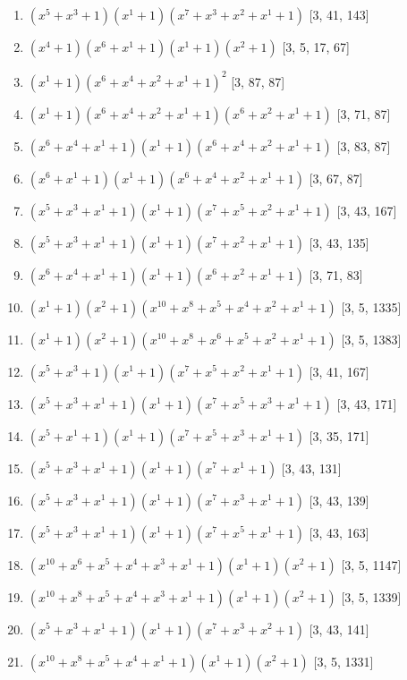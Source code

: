 \documentclass[10pt,twocolumn]{article}
\begin{document}
\begin{enumerate}
\item $(x^{5} + x^{3} + 1)(x^{1} + 1)(x^{7} + x^{3} + x^{2} + x^{1} + 1)$  [3, 41, 143]
\item $(x^{4} + 1)(x^{6} + x^{1} + 1)(x^{1} + 1)(x^{2} + 1)$  [3, 5, 17, 67]
\item $(x^{1} + 1)(x^{6} + x^{4} + x^{2} + x^{1} + 1)^{2}$  [3, 87, 87]
\item $(x^{1} + 1)(x^{6} + x^{4} + x^{2} + x^{1} + 1)(x^{6} + x^{2} + x^{1} + 1)$  [3, 71, 87]
\item $(x^{6} + x^{4} + x^{1} + 1)(x^{1} + 1)(x^{6} + x^{4} + x^{2} + x^{1} + 1)$  [3, 83, 87]
\item $(x^{6} + x^{1} + 1)(x^{1} + 1)(x^{6} + x^{4} + x^{2} + x^{1} + 1)$  [3, 67, 87]
\item $(x^{5} + x^{3} + x^{1} + 1)(x^{1} + 1)(x^{7} + x^{5} + x^{2} + x^{1} + 1)$  [3, 43, 167]
\item $(x^{5} + x^{3} + x^{1} + 1)(x^{1} + 1)(x^{7} + x^{2} + x^{1} + 1)$  [3, 43, 135]
\item $(x^{6} + x^{4} + x^{1} + 1)(x^{1} + 1)(x^{6} + x^{2} + x^{1} + 1)$  [3, 71, 83]
\item $(x^{1} + 1)(x^{2} + 1)(x^{10} + x^{8} + x^{5} + x^{4} + x^{2} + x^{1} + 1)$  [3, 5, 1335]
\item $(x^{1} + 1)(x^{2} + 1)(x^{10} + x^{8} + x^{6} + x^{5} + x^{2} + x^{1} + 1)$  [3, 5, 1383]
\item $(x^{5} + x^{3} + 1)(x^{1} + 1)(x^{7} + x^{5} + x^{2} + x^{1} + 1)$  [3, 41, 167]
\item $(x^{5} + x^{3} + x^{1} + 1)(x^{1} + 1)(x^{7} + x^{5} + x^{3} + x^{1} + 1)$  [3, 43, 171]
\item $(x^{5} + x^{1} + 1)(x^{1} + 1)(x^{7} + x^{5} + x^{3} + x^{1} + 1)$  [3, 35, 171]
\item $(x^{5} + x^{3} + x^{1} + 1)(x^{1} + 1)(x^{7} + x^{1} + 1)$  [3, 43, 131]
\item $(x^{5} + x^{3} + x^{1} + 1)(x^{1} + 1)(x^{7} + x^{3} + x^{1} + 1)$  [3, 43, 139]
\item $(x^{5} + x^{3} + x^{1} + 1)(x^{1} + 1)(x^{7} + x^{5} + x^{1} + 1)$  [3, 43, 163]
\item $(x^{10} + x^{6} + x^{5} + x^{4} + x^{3} + x^{1} + 1)(x^{1} + 1)(x^{2} + 1)$  [3, 5, 1147]
\item $(x^{10} + x^{8} + x^{5} + x^{4} + x^{3} + x^{1} + 1)(x^{1} + 1)(x^{2} + 1)$  [3, 5, 1339]
\item $(x^{5} + x^{3} + x^{1} + 1)(x^{1} + 1)(x^{7} + x^{3} + x^{2} + 1)$  [3, 43, 141]
\item $(x^{10} + x^{8} + x^{5} + x^{4} + x^{1} + 1)(x^{1} + 1)(x^{2} + 1)$  [3, 5, 1331]

\end{enumerate}
\end{document}
